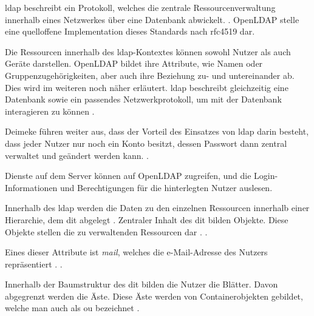 \ac{ldap} beschreibt  ein Protokoll, welches die zentrale Ressourcenverwaltung innerhalb eines Netzwerkes über eine Datenbank abwickelt.
 \citep[][611]{Deimeke2019}. OpenLDAP stelle eine quelloffene Implementation dieses Standards nach \ac{rfc}4519 dar.

Die Ressourcen innerhalb des \ac{ldap}-Kontextes können sowohl Nutzer als auch Geräte darstellen. OpenLDAP bildet ihre Attribute, wie Namen oder Gruppenzugehörigkeiten, aber auch ihre Beziehung zu- und untereinander ab. Dies wird im weiteren noch näher erläutert. 
\ac{ldap} beschreibt gleichzeitig eine Datenbank sowie ein passendes Netzwerkprotokoll, um mit der Datenbank interagieren zu können \citep[vgl.][3]{Gietz}.

Deimeke \ua führen weiter aus, dass der Vorteil des Einsatzes von \ac{ldap} darin besteht, dass jeder Nutzer nur noch ein Konto besitzt, dessen Passwort dann zentral verwaltet und geändert werden kann. 
 \citep[][611]{Deimeke2019}.

Dienste auf dem Server können auf OpenLDAP zugreifen, und die Login-Informationen und Berechtigungen für die hinterlegten Nutzer auslesen.

Innerhalb des \ac{ldap} werden die Daten zu den einzelnen Ressourcen innerhalb einer Hierarchie, dem \ac{dit} abgelegt \citep[vgl.][7]{rfc4512}. 
Zentraler Inhalt des \ac{dit} bilden Objekte. Diese Objekte stellen die zu verwaltenden Ressourcen dar \citep[vgl.][614]{Deimeke2019}. 
 \citep[][614]{Deimeke2019}. 

Eines dieser Attribute ist \zb \textit{mail}, welches die e-Mail-Adresse des Nutzers repräsentiert \citep[][18]{rfc4519}.
 \citep[][615]{Deimeke2019}.

Innerhalb der Baumstruktur des \ac{dit} bilden die Nutzer die Blätter. Davon abgegrenzt werden die Äste. Diese  Äste werden von Containerobjekten gebildet, welche man auch als \ac{ou} bezeichnet \citep[vgl.][614]{Deimeke2019}.


